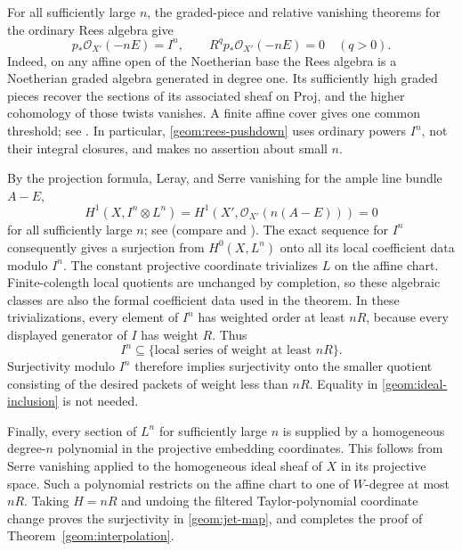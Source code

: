 For all sufficiently large $n$, the graded-piece and relative
vanishing theorems for the ordinary Rees algebra give
\begin{equation}
\label{geom:rees-pushdown}
 p_*\mathcal O_{X'}(-nE)=I^n,\qquad
 R^q p_*\mathcal O_{X'}(-nE)=0\quad(q>0).
\end{equation}
Indeed, on any affine open of the Noetherian base the Rees algebra
is a Noetherian graded algebra generated in degree one. Its
sufficiently high graded pieces recover the sections of its
associated sheaf on Proj, and the higher cohomology of those twists
vanishes. A finite affine cover gives one common threshold;
see \cite[Tags~0AG6 and~0AG7]{stacks}. In particular,
\eqref{geom:rees-pushdown} uses ordinary powers $I^n$, not their
integral closures, and makes no assertion about small $n$.

By the projection formula, Leray, and Serre vanishing for the ample
line bundle $A-E$,
\begin{equation}
\label{geom:serre-vanishing}
 H^1(X,I^n\otimes L^n)
 =H^1(X',\mathcal O_{X'}(n(A-E)))=0
\end{equation}
for all sufficiently large $n$; see \cite[Tag~0B5U]{stacks} (compare \cite{kodaira1953} and \cite[Chapter~III, Theorem~5.2]{hartshorne1977}).
The exact sequence for $I^n$ consequently gives a surjection from
$H^0(X,L^n)$ onto all its local coefficient data modulo $I^n$.
The constant projective coordinate trivializes $L$ on the affine
chart. Finite-colength local quotients are unchanged by completion,
so these algebraic classes are also the formal coefficient data used
in the theorem. In these trivializations, every element of $I^n$ has
weighted order at least $nR$, because every displayed generator
of $I$ has weight $R$. Thus
\begin{equation}
\label{geom:ideal-inclusion}
 I^n\subseteq\{\text{local series of weight at least }nR\}.
\end{equation}
Surjectivity modulo $I^n$ therefore implies surjectivity onto the
smaller quotient consisting of the desired packets of weight less
than $nR$. Equality in \eqref{geom:ideal-inclusion} is not needed.

Finally, every section of $L^n$ for sufficiently large $n$ is
supplied by a homogeneous degree-$n$ polynomial in the projective
embedding coordinates. This follows from Serre vanishing applied
to the homogeneous ideal sheaf of $X$ in its projective space.
Such a polynomial restricts on the affine chart to one of
$W$-degree at most $nR$. Taking $H=nR$ and undoing the filtered
Taylor-polynomial coordinate change proves the surjectivity in
\eqref{geom:jet-map}, and completes the proof of
Theorem~\ref{geom:interpolation}.
